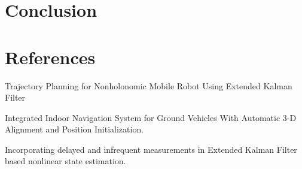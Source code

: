 \documentclass{ieeeaccess}
\begin{document}
\section{Conclusion}
\label{sec:con}


\section{References}
Trajectory Planning for Nonholonomic Mobile Robot Using Extended Kalman Filter\par
Integrated Indoor Navigation System for Ground Vehicles With Automatic 3-D Alignment and Position Initialization.\par
Incorporating delayed and infrequent measurements in Extended Kalman Filter based nonlinear state estimation.\par

\EOD
\end{document}
